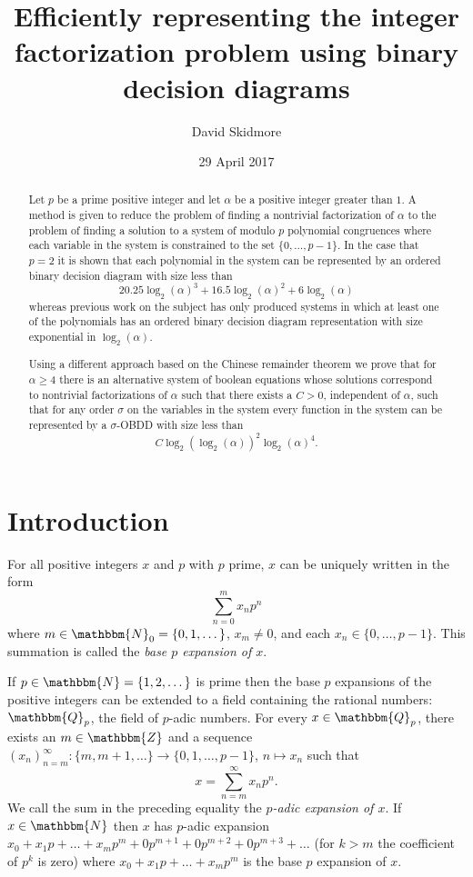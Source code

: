 \documentclass{article}
\newcommand{\Z}{\mathbbm{Z}}
\newcommand{\N}{\mathbbm{N}}
\newcommand{\Q}{\mathbbm{Q}}
\theoremstyle{theorem}
\theoremstyle{definition}
\theoremstyle{definition}
\begin{document}
\title{Efficiently representing the integer factorization problem using binary decision diagrams}
\author{David Skidmore}
\date{29 April 2017}
\maketitle

\begin{abstract}
\noindent Let $p$ be a prime positive integer and let $\alpha$ be a positive integer greater than $1$. A method is given to reduce the problem of finding a nontrivial factorization of $\alpha$ to the problem of finding a solution to a system of modulo $p$ polynomial congruences where each variable in the system is constrained to the set $\{0,\dots,p-1\}$. In the case that $p=2$ it is shown that each polynomial in the system can be represented by an ordered binary decision diagram with size less than 
$$20.25 \log_2(\alpha)^3 + 16.5 \log_2(\alpha)^2 + 6\log_2(\alpha)$$
whereas previous work on the subject has only produced systems in which at least one of the polynomials has an ordered binary decision diagram representation with size exponential in $\log_2(\alpha)$.

Using a different approach based on the Chinese remainder theorem we prove that for $\alpha \geq 4$ there is an alternative system of boolean equations whose solutions correspond to nontrivial factorizations of $\alpha$ such that there exists a $C>0$, independent of $\alpha$, such that for any order $\sigma$ on the variables in the system every function in the system can be represented by a $\sigma$-OBDD with size less than 
$$C\log_2(\log_2(\alpha))^2 \log_2(\alpha)^{4}.$$
\end{abstract}

\newpage

\tableofcontents

\newpage

\section{Introduction}
For all positive integers $x$ and $p$ with $p$ prime, $x$ can be uniquely written in the form
$$\sum_{n=0}^{m}x_np^n$$
where $m \in \N_0 = \{0,1,\dots\}$, $x_m \neq 0$, and each $x_n \in \{0,\dots, p-1\}$. This summation is called the \textit{base $p$ expansion of $x$}. 

If $p \in \N=\{1,2,\dots\}$ is prime then the base $p$ expansions of the positive integers can be extended to a field containing the rational numbers: $\Q_p$, the field of $p$-adic numbers. For every $x \in \Q_p$, there exists an $m \in \Z$ and a sequence $(x_n)_{n=m}^{\infty} : \{m,m+1,\dots\} \to \{0,1,\dots,p-1\}$, $n \mapsto x_n$ such that
$$x = \sum_{n=m}^{\infty}x_np^n.$$
We call the sum in the preceding equality the \textit{$p$-adic expansion of $x$}. If $x \in \N$ then $x$ has $p$-adic expansion $x_0+x_1p+\dots + x_mp^m+0p^{m+1}+0p^{m+2}+0p^{m+3}+\dots$ (for $k>m$ the coefficient of $p^k$ is zero) where $x_0+x_1p+\dots+x_m p^m$ is the base $p$ expansion of $x$.
\end{document}
